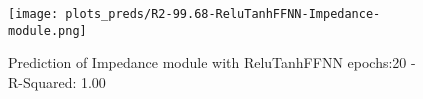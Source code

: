 
\begin{figure}[H]
    \centering
    \texttt{[image: plots\_preds/R2-99.68-ReluTanhFFNN-Impedance-module.png]}
    \caption{Prediction of Impedance module with ReluTanhFFNN epochs:20 - R-Squared: 1.00}
\end{figure}
